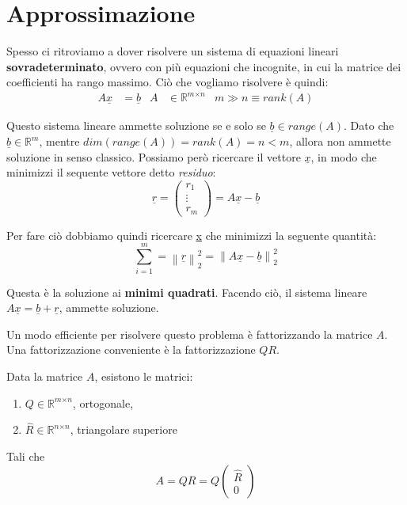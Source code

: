 \documentclass[../main.tex]{subfiles}
\begin{document}
\section{Approssimazione}
Spesso ci ritroviamo a dover risolvere un sistema di equazioni lineari \textbf{sovradeterminato}, ovvero con più equazioni che incognite, 
in cui la matrice dei coefficienti ha rango massimo. Ciò che vogliamo risolvere è quindi:
\begin{align}
    A\underline{x}&=\underline{b}   &   A&\in\mathbb{R^{\textit{m}\times \textit{n}}} &m\gg n\equiv rank(A)
\end{align} \label{eq:sovradeterminato}

Questo sistema lineare ammette soluzione se e solo se $\underline{b}\in range(A)$. Dato che $\underline{b}\in\mathbb{R^\textit{m}}$,
mentre $dim(range(A)) = rank(A) = n < m$, allora non ammette soluzione in senso classico.
Possiamo però ricercare il vettore $\underline{x}$, in modo che minimizzi il sequente vettore detto \textit{residuo}:
\begin{equation}
    \underline{r} = \begin{pmatrix}
        r_1\\ \vdots \\ r_m
    \end{pmatrix} = A\underline{x} - \underline{b}
    \label{eq:residuo}
\end{equation}

Per fare ciò dobbiamo quindi ricercare \underline{x} che minimizzi la seguente quantità:
\begin{equation}
    \sum_{i=1}^{m} = \left\lVert \underline{r} \right\rVert^2_2 = \left\lVert A\underline{x} - \underline{b}\right\rVert^2_2
    \label{eq:minimi_quadrati}
\end{equation}

Questa è la soluzione ai \textbf{minimi quadrati}. Facendo ciò, il sistema lineare $A\underline{x} = \underline{b}+\underline{r}$, 
ammette soluzione.

Un modo efficiente per risolvere questo problema è fattorizzando la matrice $A$. Una fattorizzazione conveniente è 
la fattorizzazione $QR$.

\begin{theorem}[Fattorizzazione QR]
    Data la matrice $A$, esistono le matrici:
    \begin{enumerate}
        \item $Q \in \mathbb{R^{\textit{m}\times \textit{n}}}$, ortogonale,
        \item $\hat{R} \in \mathbb{R^{\textit{n}\times \textit{n}}}$, triangolare superiore
    \end{enumerate}
    Tali che \begin{equation}
        A = QR = Q\begin{pmatrix}
            \hat{R} \\0
        \end{pmatrix}
    \end{equation} \label{eq:QR}
\end{theorem}
\end{document}
